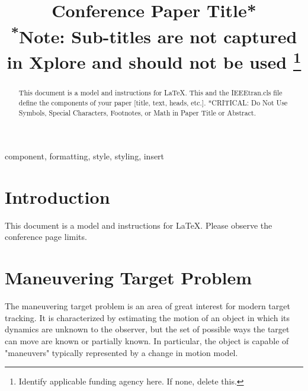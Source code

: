 \documentclass[conference]{IEEEtran}
\begin{document}
\title{Conference Paper Title*\\
{\footnotesize \textsuperscript{*}Note: Sub-titles are not captured in Xplore and
should not be used}
\thanks{Identify applicable funding agency here. If none, delete this.}
}

\author{
\and
{}
\and
{}
\and
{}
}


\maketitle

\begin{abstract}
This document is a model and instructions for \LaTeX.
This and the IEEEtran.cls file define the components of your paper [title, text, heads, etc.]. *CRITICAL: Do Not Use Symbols, Special Characters, Footnotes, 
or Math in Paper Title or Abstract.
\end{abstract}

\begin{IEEEkeywords}
component, formatting, style, styling, insert
\end{IEEEkeywords}

\section{Introduction}
This document is a model and instructions for \LaTeX.
Please observe the conference page limits. 

\section{Maneuvering Target Problem}
The maneuvering target problem is an area of great interest for modern target tracking. It is characterized by estimating the motion of an object in which its dynamics are unknown to the observer, but the set of possible ways the target can move are known or partially known. In particular, the object is capable of "maneuvers" typically represented by a change in motion model.
\end{document}
